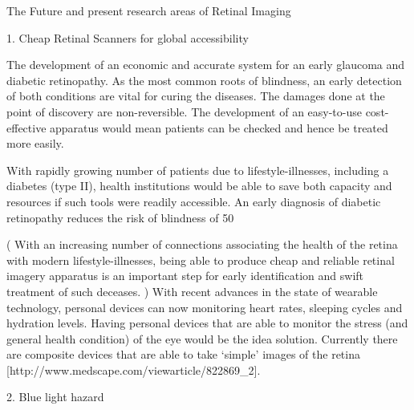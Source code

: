 
The Future and present research areas of Retinal Imaging

1. Cheap Retinal Scanners for global accessibility

The development of an economic and accurate system for an early glaucoma and diabetic retinopathy. As the most common roots of blindness, an early detection of both conditions are vital for curing the diseases. The damages done at the point of discovery are non-reversible. The development of an easy-to-use cost-effective apparatus would mean patients can be checked and hence be treated more easily. 

With rapidly growing number of patients due to lifestyle-illnesses, including a diabetes (type II), health institutions would be able to save both capacity and resources if such tools were readily accessible. An early diagnosis of diabetic retinopathy reduces the risk of blindness of 50%

( With an increasing number of connections associating the health of the retina with modern lifestyle-illnesses, being able to produce cheap and reliable retinal imagery apparatus is an important step for early identification and swift treatment of such deceases. ) With recent advances in the state of wearable technology, personal devices can now monitoring heart rates, sleeping cycles and hydration levels. Having personal devices that are able to monitor the stress (and general health condition) of the eye would be the idea solution. Currently there are composite devices that are able to take ‘simple’ images of the retina [http://www.medscape.com/viewarticle/822869_2]. 
 
2. Blue light hazard

